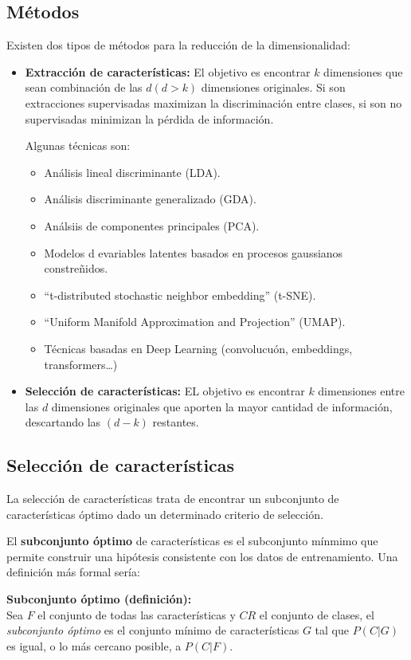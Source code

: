 \documentclass[12pt, letterpaper]{article}
\begin{document}
\subsection{Métodos}
Existen dos tipos de métodos para la reducción de la dimensionalidad:
\begin{itemize}
    \item \textbf{Extracción de características:} El objetivo es encontrar $k$ dimensiones que sean combinación de las $d (d > k)$ dimensiones originales. Si son extracciones supervisadas maximizan la discriminación entre clases, si son no supervisadas minimizan la pérdida de información.
    
    Algunas técnicas son:
    \begin{itemize}
        \item Análisis lineal discriminante (LDA).
        \item Análisis discriminante generalizado (GDA).
        \item Análsiis de componentes principales (PCA).
        \item Modelos d evariables latentes basados en procesos gaussianos constreñidos.
        \item ``t-distributed stochastic neighbor embedding'' (t-SNE).
        \item ``Uniform Manifold Approximation and Projection'' (UMAP).
        \item Técnicas basadas en Deep Learning (convolucuón, embeddings, transformers\ldots)
    \end{itemize}

    \item \textbf{Selección de características:} EL objetivo es encontrar $k$ dimensiones entre las $d$ dimensiones originales que aporten la mayor cantidad de información, descartando las $(d-k)$ restantes.
\end{itemize}

\subsection{Selección de características}
La selección de características trata de encontrar un subconjunto de características óptimo dado un determinado criterio de selección.

El \textbf{subconjunto óptimo} de características es el subconjunto mínmimo que permite construir una hipótesis consistente con los datos de entrenamiento. Una definición más formal sería:

\textbf{Subconjunto óptimo (definición):} \\
Sea $F$ el conjunto de todas las características y $CR$ el conjunto de clases, el \textit{subconjunto óptimo} es el conjunto mínimo de características $G$ tal que $P(C|G)$ es igual, o lo más cercano posible, a $P(C|F)$.
\end{document}

